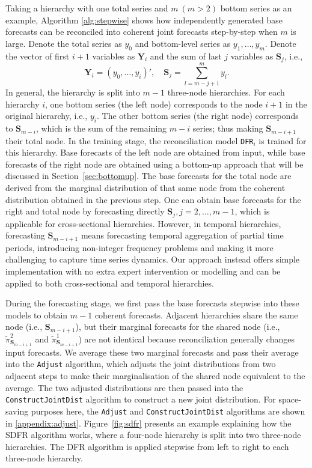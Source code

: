 \documentclass[a4paper,review,12pt,authoryear]{elsarticle}
\let\code=\texttt
\newcommand{\bY}{\mathbf{Y}}
\theoremstyle{definition}
\begin{document}
  Taking a hierarchy with one total series and $m~(m>2)$ bottom series as an example, Algorithm \ref{alg:stepwise} shows how independently generated base forecasts can be reconciled into coherent joint forecasts step-by-step when $m$ is large.
  Denote the total series as $y_0$ and bottom-level series as $y_1, \dots, y_m$.
  Denote the vector of first $i+1$ variables as $\mathbf{Y}_i$ and the sum of last $j$ variables as $\mathbf{S}_j$, i.e.,
  \[
    \bY_i = (y_0, \dots, y_i)', \quad \mathbf{S}_j = \sum_{l=m-j+1}^{m} y_l.
  \]
  In general, the hierarchy is split into $m-1$ three-node hierarchies.
  For each hierarchy $i$, one bottom series (the left node) corresponds to the node $i+1$ in the original hierarchy, i.e., $y_{i}$. The other bottom series (the right node) corresponds to $\mathbf{S}_{m-i}$, which is the sum of the remaining $m-i$ series; thus making $\mathbf{S}_{m-i+1}$ their total node.
  In the training stage, the reconciliation model \code{DFR}$_i$ is trained for this hierarchy.
  Base forecasts of the left node are obtained from input, while base forecasts of the right node are obtained using a bottom-up approach that will be discussed in Section~\ref{sec:bottomup}.
  The base forecasts for the total node are derived from the marginal distribution of that same node from the coherent distribution obtained in the previous step.
  One can obtain base forecasts for the right and total node by forecasting directly $\mathbf{S}_{j}, j=2,\dots,m-1$, which is applicable for cross-sectional hierarchies.
  However, in temporal hierarchies, forecasting $\mathbf{S}_{m-i+1}$ means forecasting temporal aggregation of partial time periods, introducing non-integer frequency problems and making it more challenging to capture time series dynamics.
  Our approach instead offers simple implementation with no extra expert intervention or modelling and can be applied to both cross-sectional and temporal hierarchies.

  During the forecasting stage, we first pass the base forecasts stepwise into these models to obtain $m-1$ coherent forecasts.
  Adjacent hierarchies share the same node (i.e., $\mathbf{S}_{m-i+1}$), but their marginal forecasts for the shared node (i.e., $\tilde\pi^{2}_{\mathbf{S}_{m-i+1}}$ and $\tilde\pi^{1}_{\mathbf{S}_{m-i+1}}$) are not identical because reconciliation generally changes input forecasts.
  We average these two marginal forecasts and pass their average into the \code{Adjust} algorithm, which adjusts the joint distributions from two adjacent steps to make their marginalisation of the shared node equivalent to the average.
  The two adjusted distributions are then passed into the \code{ConstructJointDist} algorithm to construct a new joint distribution.
  For space-saving purposes here, the \code{Adjust} and \code{ConstructJointDist} algorithms are shown in \ref{appendix:adjust}.
  Figure~\ref{fig:sdfr} presents an example explaining how the SDFR algorithm works, where a four-node hierarchy is split into two three-node hierarchies. The DFR algorithm is  applied stepwise from left to right to each three-node hierarchy.
\end{document}
